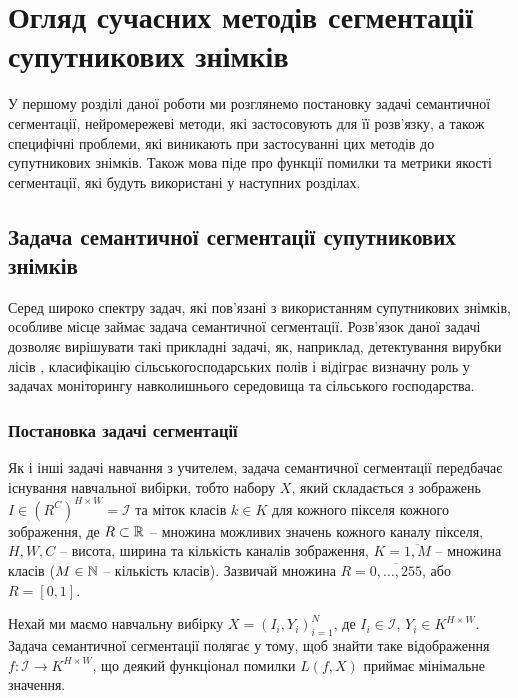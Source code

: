 
\chapter{Огляд сучасних методів сегментації супутникових знімків}
\label{chap:sem_segm}

У першому розділі даної роботи ми розглянемо постановку
задачі семантичної сегментації, нейромережеві методи, які
застосовують для її розв'язку, а також специфічні проблеми,
які виникають при застосуванні цих методів до супутникових
знімків. Також мова піде про функції помилки та метрики якості
сегментації, які будуть використані у наступних розділах.

\section{Задача семантичної сегментації супутникових знімків}

Серед широко спектру задач, які пов'язані з використанням
супутникових знімків, особливе місце займає задача семантичної
сегментації. Розв'язок даної задачі дозволяє вирішувати такі прикладні задачі,
як, наприклад, детектування вирубки лісів \cite{sat_logging}, класифікацію
сільськогосподарських полів \cite{kussul2017deep}
і відіграє визначну роль у задачах моніторингу навколишнього
середовища та сільського господарства.

\subsection{Постановка задачі сегментації}

Як і інші задачі навчання з учителем, задача семантичної сегментації
передбачає існування навчальної вибірки, тобто набору $X$,
який складається з зображень
$I \in \left( R^C \right)^{H \times W} = \mathcal{I}$ та міток класів
$k \in K$ для кожного пікселя кожного зображення, де $R \subset \operatorname{\mathbb{R}}$ --
множина можливих значень кожного каналу пікселя,
$H, W, C$ -- висота, ширина та кількість каналів зображення,
$K = \overline{1, M}$ -- множина класів ($M \in \operatorname{\mathbb{N}}$ -- кількість класів).
Зазвичай множина $R = \overline{0, \dots, 255}$, або $R = [0, 1]$.

\begin{definition} \label{def:sem_segm_task}
    Нехай ми маємо навчальну вибірку $X=(I_i, Y_i)_{i=1}^{N}$,
    де $I_i \in \mathcal{I}$, $Y_i \in K^{H \times W}$.
    Задача семантичної сегментації полягає у тому, щоб
    знайти таке відображення
    $f: \mathcal{I} \rightarrow K^{H \times W}$, що деякий функціонал помилки
    $L(f, X)$ приймає мінімальне значення.
\end{definition}

